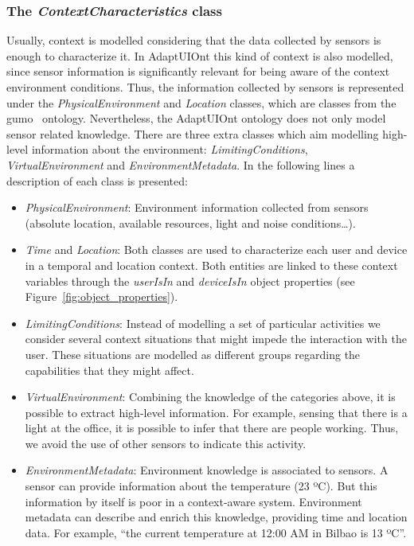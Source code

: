 \subsubsection{The \textit{ContextCharacteristics} class}
\label{sec:context_characteristics_class}

Usually, context is modelled considering that the data collected by sensors is
enough to characterize it. In AdaptUIOnt this kind of context is also modelled,
since sensor information is significantly relevant for being aware of the context
environment conditions. Thus, the information collected by sensors is represented
under the \textit{PhysicalEnvironment} and \textit{Location} classes, which are
classes from the \ac{gumo}~\citep{heckmann_gumogeneral_2005} ontology. Nevertheless,
the AdaptUIOnt ontology does not only model sensor related knowledge. There are
three extra classes which aim modelling high-level information about the
environment: \textit{LimitingConditions}, \textit{VirtualEnvironment} and
\textit{EnvironmentMetadata}. In the following lines a description of each class
is presented:

\begin{itemize}
 \item \textit{PhysicalEnvironment}: Environment information collected from
 sensors (absolute location, available resources, light and noise conditions\dots).
 
 \item \textit{Time} and \textit{Location}: Both classes are used to characterize
 each user and device in a temporal and location context. Both entities are linked
 to these context variables through the \textit{userIsIn} and \textit{deviceIsIn}
 object properties (see Figure~\ref{fig:object_properties}).
 
 \item \textit{LimitingConditions}: Instead of modelling a set of particular
 activities we consider several context situations that might impede the interaction
 with the user. These situations are modelled as different groups regarding the
 capabilities that they might affect.
 
 \item \textit{VirtualEnvironment}: Combining the knowledge of the categories
 above, it is possible to extract high-level information. For example, sensing
 that there is a light at the office, it is possible to infer that there are
 people working. Thus, we avoid the use of other sensors to indicate this
 activity.
 
 \item \textit{EnvironmentMetadata}: Environment knowledge is associated to
 sensors. A sensor can provide information about the temperature (23 ºC). But
 this information by itself is poor in a context-aware system. Environment metadata
 can describe and enrich this knowledge, providing time and location data. For
 example, ``the current temperature at 12:00 AM in Bilbao is 13 ºC''.
\end{itemize}


